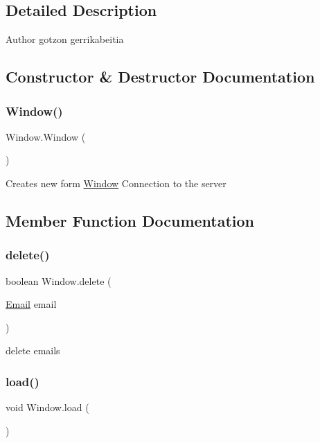 \subsection{Detailed Description}
\begin{DoxyAuthor}{Author}
gotzon gerrikabeitia 
\end{DoxyAuthor}


\subsection{Constructor \& Destructor Documentation}
\mbox{\label{class_window_ad0552903a3d5b009c0d882f9ad2571ff}} 
\subsubsection{\texorpdfstring{Window()}{Window()}}
{\footnotesize\ttfamily Window.\+Window (\begin{DoxyParamCaption}{ }\end{DoxyParamCaption})}

Creates new form \hyperlink{class_window}{Window} Connection to the server 

\subsection{Member Function Documentation}
\mbox{\label{class_window_a483632edb0590ebb925da330fd422e2f}} 
\subsubsection{\texorpdfstring{delete()}{delete()}}
{\footnotesize\ttfamily boolean Window.\+delete (\begin{DoxyParamCaption}\item[{\hyperlink{class_email}{Email}}]{email }\end{DoxyParamCaption})}

delete emails \mbox{\label{class_window_ab76a4c258774324cbd2559a912c8d89b}} 
\subsubsection{\texorpdfstring{load()}{load()}}
{\footnotesize\ttfamily void Window.\+load (\begin{DoxyParamCaption}{ }\end{DoxyParamCaption})}

